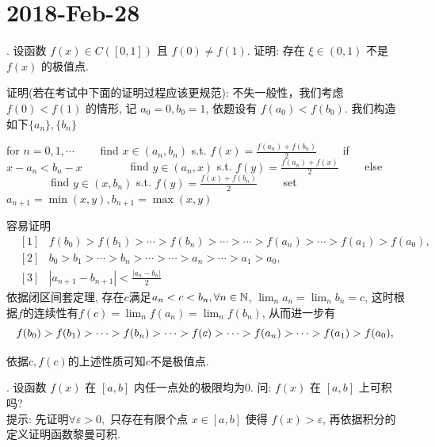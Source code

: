 \documentclass[a4paper,12pt]{article}
\author{龙子超}
\title{{\heiti {\zihao{3} 数学分析II-习题课}}}
\date{}
\begin{document}
\maketitle
%


\section*{2018-Feb-28}
. 设函数 $f(x)\in C([0,1])$ 且 $f(0)\neq f(1)$. 证明: 存在 $\xi\in(0,1)$ 不是 $f(x)$ 的极值点.

\noindent 证明(若在考试中下面的证明过程应该更规范): 不失一般性，我们考虑 $f(0)<f(1)$ 的情形, 记 $a_0=0,b_0=1$, 依题设有 $f(a_0)<f(b_0)$. 我们构造如下$\{a_n\},\{b_n\}$
\begin{algorithm}
  \begin{algorithmic}
    \State for $n=0,1,\cdots$
    \State \ \ \ \ find $x\in(a_n,b_n)$ s.t. $f(x)=\frac{f(a_n)+f(b_n)}{2}$
    \State \ \ \ \ if $x-a_n<b_n-x$
    \State \ \ \ \ \ \ \ \ find $y\in(a_n,x)$ s.t. $f(y)=\frac{f(a_n)+f(x)}{2}$
    \State \ \ \ \ else 
    \State \ \ \ \ \ \ \ \ find $y\in(x,b_n)$ s.t. $f(y)=\frac{f(x)+f(b_n)}{2}$
    \State \ \ \ \ set $a_{n+1}=\min(x,y),b_{n+1}=\max(x,y)$
  \end{algorithmic}
\end{algorithm}

容易证明
\begin{eqnarray*}
  &[1]&f(b_0)>f(b_1)>\cdots>f(b_n)>\cdots>\cdots>f(a_n)>\cdots>f(a_1)>f(a_0),\\
  &[2]&b_0>b_1>\cdots>b_n>\cdots>\cdots>a_n>\cdots>a_1>a_0,\\
  &[3]&|a_{n+1}-b_{n+1}|<\frac{|a_n-b_n|}{2}
\end{eqnarray*}
依据闭区间套定理, 存在$c$满足$a_n<c<b_n,\forall n\in \mathbb{N}$, $\lim_n a_n=\lim_n b_n=c$, 这时根据$f$的连续性有$f(c)=\lim_n f(a_n)=\lim_nf(b_n)$, 从而进一步有
\[
  f(b_0)>f(b_1)>\cdots>f(b_n)>\cdots>f(c)>\cdots>f(a_n)>\cdots>f(a_1)>f(a_0),\\
\]

依据$c,f(c)$的上述性质可知$c$不是极值点.

. 设函数 $f(x)$ 在 $[a,b]$ 内任一点处的极限均为0. 问: $f(x)$ 在 $[a,b]$ 上可积吗?\\
提示: 先证明$\forall \varepsilon>0,$ 只存在有限个点 $x\in[a,b]$ 使得 $f(x)>\varepsilon$, 再依据积分的定义证明函数黎曼可积.
\end{document}
